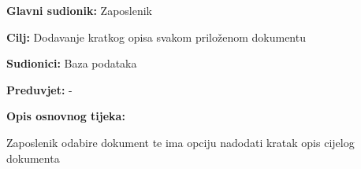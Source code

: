 				\noindent {}
				\begin{packed_item}
					
					\item \textbf{Glavni sudionik:} Zaposlenik
					\item  \textbf{Cilj:} Dodavanje kratkog opisa svakom priloženom dokumentu
					\item  \textbf{Sudionici:} Baza podataka
					\item  \textbf{Preduvjet:} -
					\item  \textbf{Opis osnovnog tijeka:}
					
					\item[] \begin{packed_enum}
						
						\item Zaposlenik odabire dokument te ima opciju nadodati kratak opis cijelog dokumenta
						
					\end{packed_enum}
					
				\end{packed_item}
			
